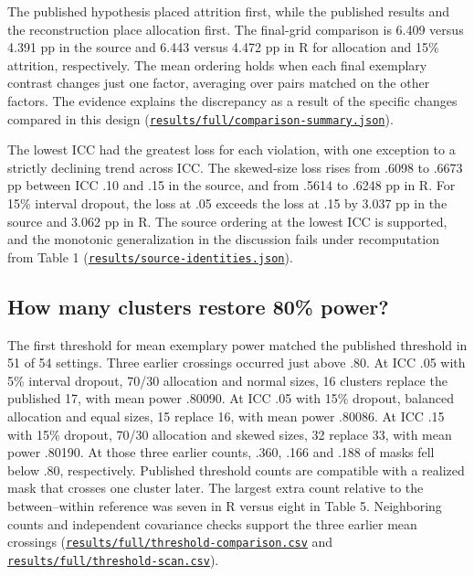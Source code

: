The published hypothesis placed attrition first, while the published results and the reconstruction place allocation first. The final-grid comparison is 6.409 versus 4.391 pp in the source and 6.443 versus 4.472 pp in R for allocation and 15\% attrition, respectively. The mean ordering holds when each final exemplary contrast changes just one factor, averaging over pairs matched on the other factors. The evidence explains the discrepancy as a result of the specific changes compared in this design (\href{https://github.com/alectionary/vibe-math/blob/master/formalization/kupzyk-power-assumptions/results/full/comparison-summary.json}{\nolinkurl{results/full/comparison-summary.json}}).
\label{dis:predicted-order}

The lowest ICC had the greatest loss for each violation, with one exception to a strictly declining trend across ICC. The skewed-size loss rises from .6098 to .6673 pp between ICC .10 and .15 in the source, and from .5614 to .6248 pp in R. For 15\% interval dropout, the loss at .05 exceeds the loss at .15 by 3.037 pp in the source and 3.062 pp in R. The source ordering at the lowest ICC is supported, and the monotonic generalization in the discussion fails under recomputation from Table 1 (\href{https://github.com/alectionary/vibe-math/blob/master/formalization/kupzyk-power-assumptions/results/source-identities.json}{\nolinkurl{results/source-identities.json}}).
\label{dis:skew-icc-monotonicity}

\subsection{How many clusters restore 80\% power?}\label{sec:thresholds}
The first threshold for mean exemplary power matched the published threshold in 51 of 54 settings. Three earlier crossings occurred just above .80. At ICC .05 with 5\% interval dropout, 70/30 allocation and normal sizes, 16 clusters replace the published 17, with mean power .80090. At ICC .05 with 15\% dropout, balanced allocation and equal sizes, 15 replace 16, with mean power .80086. At ICC .15 with 15\% dropout, 70/30 allocation and skewed sizes, 32 replace 33, with mean power .80190. At those three earlier counts, .360, .166 and .188 of masks fell below .80, respectively. Published threshold counts are compatible with a realized mask that crosses one cluster later. The largest extra count relative to the between--within reference was seven in R versus eight in Table 5. Neighboring counts and independent covariance checks support the three earlier mean crossings (\href{https://github.com/alectionary/vibe-math/blob/master/formalization/kupzyk-power-assumptions/results/full/threshold-comparison.csv}{\nolinkurl{results/full/threshold-comparison.csv}} and \href{https://github.com/alectionary/vibe-math/blob/master/formalization/kupzyk-power-assumptions/results/full/threshold-scan.csv}{\nolinkurl{results/full/threshold-scan.csv}}).
\label{dis:threshold-mask}

